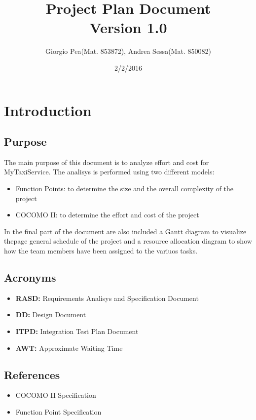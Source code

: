 \documentclass[11pt,titlepage]{article} %
\title{Project Plan Document \\ \vspace{1cm} \large{Version 1.0}}
\author{Giorgio Pea(Mat. 853872), Andrea Sessa(Mat. 850082)}
\date{2/2/2016}
\begin{document}
\maketitle

\newpage

\tableofcontents

\newpage

\section{Introduction}
  \subsection{Purpose}
    The main purpose of this document is to analyze effort and cost for MyTaxiService.
    The analisys is performed using two different models:
    \begin{itemize}
     \item Function Points: to determine the size and the overall complexity of the project
     \item COCOMO II: to determine the effort and cost of the project
    \end{itemize}
    In the final part of the document are also included a Gantt diagram to visualize thepage
    general schedule of the project and a resource allocation diagram to show how the team 
    members have been assigned to the variuos tasks.

  \subsection{Acronyms}
    \begin{itemize}
     \item \textbf{RASD:} Requirements Analisys and Specification Document
     \item \textbf{DD:} Design Document
     \item \textbf{ITPD:} Integration Test Plan Document
     \item \textbf{AWT:} Approximate Waiting Time
    \end{itemize}
  \subsection{References}
    \begin{itemize}
     \item COCOMO II Specification
     \item Function Point Specification
    \end{itemize}
\end{document}
